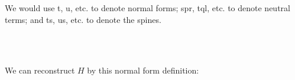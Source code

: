 We would use t, u, etc. to denote normal forms; spr, tql, etc. to denote neutral terms; and ts, us, etc. to denote the spines.

\begin{code}[hide]%
\>[0]\AgdaSpace{}%
\AgdaSpace{}%
\AgdaSpace{}%
\AgdaSpace{}%
\AgdaSymbol{:}\AgdaSpace{}%
\AgdaSpace{}%
\AgdaSpace{}%
\<%
\\
\>[0]\AgdaSpace{}%
\AgdaSpace{}%
\AgdaSpace{}%
\AgdaSymbol{:}\AgdaSpace{}%
\AgdaSpace{}%
\AgdaSpace{}%
\<%
\\
\>[0]\AgdaSpace{}%
\AgdaSpace{}%
\AgdaSpace{}%
\AgdaSymbol{:}\AgdaSpace{}%
\AgdaSpace{}%
\AgdaSpace{}%
\AgdaSpace{}%
\<%
\end{code}

We can reconstruct $H$ by this normal form definition:

